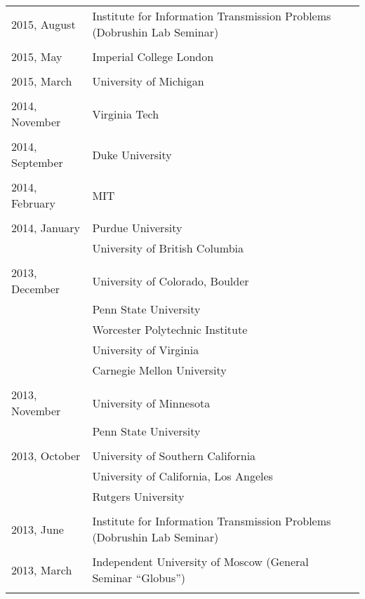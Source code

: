 \documentclass[letterpaper,11pt]{article}
\begin{document}
\begin{longtable}{llc}
	2015, August
	& Institute for Information Transmission Problems
	(Dobrushin Lab Seminar)
	\\\\

	2015, May
	& Imperial College London
	\\\\

	2015, March
	& University of Michigan
	\\\\

	2014, November
	& Virginia Tech\\\\

	2014, September
	& Duke University\\\\

	2014, February
	& MIT\\\\

	2014, January
	  & Purdue University & \hspace{110pt}
	\\& University of British Columbia \\\\

	2013, December
	& University of Colorado, Boulder
	\\&Penn State University\\&Worcester Polytechnic Institute
	\\&University of Virginia\\&
	Carnegie Mellon University \\\\

	2013, November&
	University of Minnesota \\&
	Penn State University \\\\

	2013, October&
	University of Southern California
	\\&
	University of California, Los Angeles
	\\&Rutgers University\\\\

	2013, June& Institute for Information Transmission Problems
	(Dobrushin Lab Seminar)\\\\

	2013, March& Independent University of Moscow (General Seminar
	``Globus'')\\\\


\end{longtable}
\end{document}
